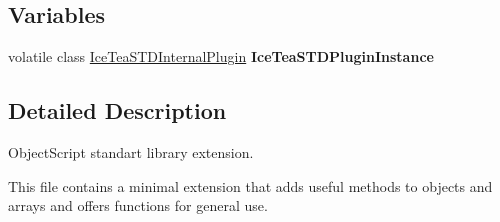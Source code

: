 \subsection*{Variables}
\begin{DoxyCompactItemize}
\item 
volatile class \hyperlink{class_ice_tea_s_t_d_internal_plugin}{Ice\+Tea\+S\+T\+D\+Internal\+Plugin} {\bfseries Ice\+Tea\+S\+T\+D\+Plugin\+Instance}\hypertarget{os-std_8cpp_ab8133066a9816c95ebd8c4c41c3e6b4e}{}\label{os-std_8cpp_ab8133066a9816c95ebd8c4c41c3e6b4e}

\end{DoxyCompactItemize}


\subsection{Detailed Description}
Object\+Script standart library extension. 

This file contains a minimal extension that adds useful methods to objects and arrays and offers functions for general use. 